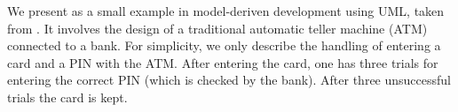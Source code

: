 \documentclass[10pt,fleqn,%
\ifpretendfinal
final%
\else
draft%
\fi,
]{scrreprt}
\begin{document}
We present as a small example in model-deriven development using UML,
taken from \cite{knapp-mossakowski-roggenbach:corr:2014}.  It involves
the design of a traditional automatic teller machine (ATM) connected
to a bank. For simplicity, we only describe the handling of entering a
card and a PIN with the ATM. After entering the card, one has three
trials for entering the correct PIN (which is checked by the
bank). After three unsuccessful trials the card is kept.

\begin{figure}[!Ht]
\centering
{}
\hspace*{0.5cm}
\\
\end{figure}
\end{document}
